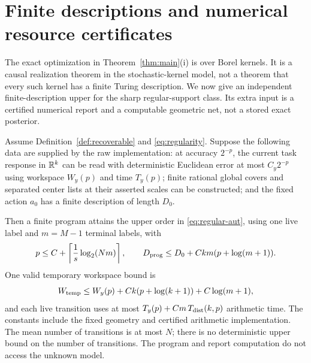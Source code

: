\section{Finite descriptions and numerical resource certificates}\label{app:computation}
The exact optimization in Theorem~\ref{thm:main}(i) is over Borel kernels. It is a causal realization theorem in the stochastic-kernel model, not a theorem that every such kernel has a finite Turing description. We now give an independent finite-description upper for the sharp regular-support class. Its extra input is a certified numerical report and a computable geometric net, not a stored exact posterior.

\begin{proposition}\label{prop:finite-bit}
Assume Definition~\ref{def:recoverable} and \eqref{eq:regularity}. Suppose the following data are supplied by the raw implementation: at accuracy $2^{-p}$, the current task response in $\mathbb R^k$ can be read with deterministic Euclidean error at most $C_y2^{-p}$ using workspace $W_y(p)$ and time $T_y(p)$; finite rational global covers and separated center lists at their asserted scales can be constructed; and the fixed action $a_0$ has a finite description of length $D_0$.

Then a finite program attains the upper order in \eqref{eq:regular-aut}, using one live label and $m=M-1$ terminal labels, with
\begin{equation}\label{eq:precision-cost}
 p\le C+\left\lceil\frac1s\log_2(Nm)\right\rceil,
 \qquad D_{\rm prog}\le D_0+Ckm(p+\log(m+1)).
\end{equation}
One valid temporary workspace bound is
\begin{equation}\label{eq:workspace-cost}
 W_{\rm temp}\le W_y(p)+Ck(p+\log(k+1))+C\log(m+1),
\end{equation}
and each live transition uses at most $T_y(p)+Cm\,T_{\rm dist}(k,p)$ arithmetic time. The constants include the fixed geometry and certified arithmetic implementation. The mean number of transitions is at most $N$; there is no deterministic upper bound on the number of transitions. The program and report computation do not access the unknown model.
\end{proposition}
